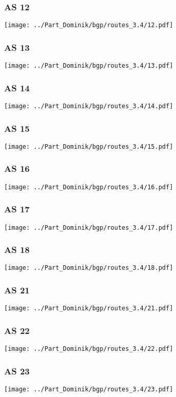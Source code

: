 \subsubsection{AS 12}
\texttt{[image: ../Part\_Dominik/bgp/routes\_3.4/12.pdf]}
\clearpage
\subsubsection{AS 13}
\texttt{[image: ../Part\_Dominik/bgp/routes\_3.4/13.pdf]}
\clearpage
\subsubsection{AS 14}
\texttt{[image: ../Part\_Dominik/bgp/routes\_3.4/14.pdf]}
\clearpage
\subsubsection{AS 15}
\texttt{[image: ../Part\_Dominik/bgp/routes\_3.4/15.pdf]}
\clearpage
\subsubsection{AS 16}
\texttt{[image: ../Part\_Dominik/bgp/routes\_3.4/16.pdf]}
\clearpage
\subsubsection{AS 17}
\texttt{[image: ../Part\_Dominik/bgp/routes\_3.4/17.pdf]}
\clearpage
\subsubsection{AS 18}
\texttt{[image: ../Part\_Dominik/bgp/routes\_3.4/18.pdf]}
\clearpage
\subsubsection{AS 21}
\texttt{[image: ../Part\_Dominik/bgp/routes\_3.4/21.pdf]}
\clearpage
\subsubsection{AS 22}
\texttt{[image: ../Part\_Dominik/bgp/routes\_3.4/22.pdf]}
\clearpage
\subsubsection{AS 23}
\texttt{[image: ../Part\_Dominik/bgp/routes\_3.4/23.pdf]}
\clearpage
